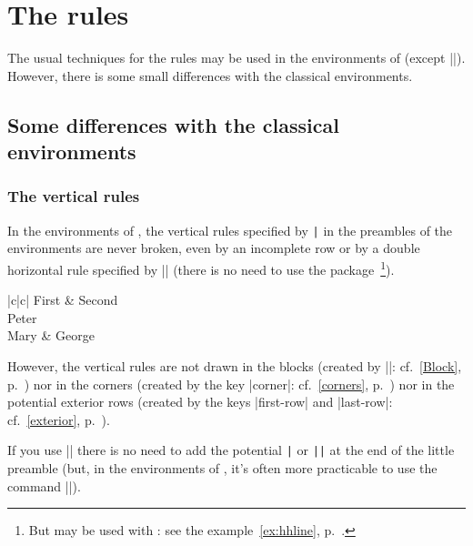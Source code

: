 \documentclass[dvipsnames]{article}
\begin{document}


\section{The rules}

\label{rules}

The usual techniques for the rules may be used in the environments of
 (except |\vline|). However, there is some small differences
with the classical environments.

\bigskip
\subsection{Some differences with the classical environments}

\subsubsection{The vertical rules}

In the environments of , the vertical rules specified by
\verb+|+ in the preambles of the environments are never broken, even by an
incomplete row or by a double horizontal rule specified by |\hline\hline|
(there is no need to use the package~\footnote{But  may be
used with : see the example~\ref{ex:hhline}, p.~\pageref{ex:hhline}.}).

\bigskip
\begin{Code}[width=10cm,show-output]
\begin{NiceTabular}{|c|c|} \hline
  First & Second \\ \emph{\hline\hline}
  Peter \\ \hline
  Mary & George\\ \hline
\end{NiceTabular}
\end{Code}

\bigbreak
However, the vertical rules are not drawn in the blocks (created by |\Block|:
cf.~\ref{Block}, p.~\pageref{Block}) nor in the corners (created by the key |corner|:
cf.~\ref{corners}, p.~\pageref{corners}) nor in the potential exterior rows (created by the
keys |first-row| and |last-row|: cf.~\ref{exterior}, p.~\pageref{exterior}).

\medskip
If you use |\multicolumn| there is no need to add the potential \verb+|+ or
\verb+||+ at the end of the little preamble (but, in the environments of
, it's often more practicable to use the command |\Block|).
\end{document}
